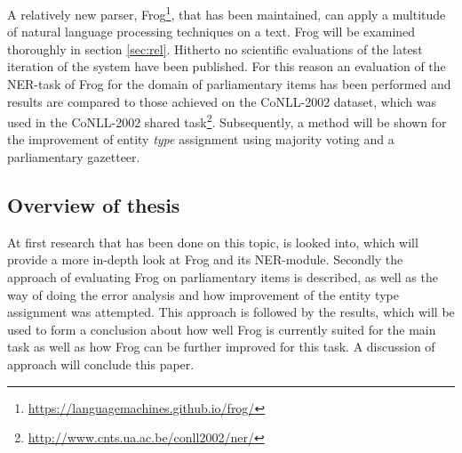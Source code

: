 A relatively new parser, Frog\footnote{\url{https://languagemachines.github.io/frog/}}, that has been maintained, can apply a multitude of natural language processing techniques on a text. Frog will be examined thoroughly in section \ref{sec:rel}. Hitherto no scientific evaluations of the latest iteration of the system have been published. For this reason an evaluation of  the NER-task of Frog for the domain of parliamentary items has been performed and results are compared to those achieved on the CoNLL-2002 dataset, which was used in the CoNLL-2002 shared task\footnote{\url{http://www.cnts.ua.ac.be/conll2002/ner/}}. Subsequently, a method will be shown for the improvement of entity \textit{type} assignment using majority voting and a parliamentary gazetteer.

\subsection{Overview of thesis}
At first research that has been done on this topic, is looked into, which will provide a more in-depth look at Frog and its NER-module. Secondly the approach of evaluating Frog on parliamentary items is described, as well as the way of doing the error analysis and how improvement of the entity type assignment was attempted. This approach is followed by the results, which will be used to form a conclusion about how well Frog is currently suited for the main task as well as how Frog can be further improved for this task. A discussion of approach will conclude this paper.

